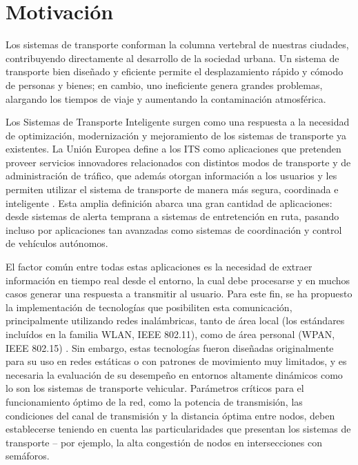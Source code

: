 \section{Motivación}

Los sistemas de transporte conforman la columna vertebral de nuestras ciudades, contribuyendo directamente al desarrollo de la sociedad urbana. Un sistema de transporte bien diseñado y eficiente permite el desplazamiento rápido y cómodo de personas y bienes; en cambio, uno ineficiente genera grandes problemas, alargando los tiempos de viaje y aumentando la contaminación atmosférica.

Los Sistemas de Transporte Inteligente surgen como una respuesta a la necesidad de optimización, modernización y mejoramiento de los sistemas de transporte ya existentes. La Unión Europea define a los ITS como aplicaciones que pretenden proveer servicios innovadores relacionados con distintos modos de transporte y de administración de tráfico, que además otorgan información a los usuarios y les permiten utilizar el sistema de transporte de manera más segura, coordinada e inteligente \cite{eudirective}. Esta amplia definición abarca una gran cantidad de aplicaciones: desde sistemas de alerta temprana a sistemas de entretención en ruta, pasando incluso por aplicaciones tan avanzadas como sistemas de coordinación y control de vehículos autónomos. 

El factor común entre todas estas aplicaciones es la necesidad de extraer información en tiempo real desde el entorno, la cual debe procesarse y en muchos casos generar una respuesta a transmitir al usuario. Para este fin, se ha propuesto la implementación de tecnologías que posibiliten esta comunicación, principalmente utilizando redes inalámbricas, tanto de área local (los estándares incluídos en la familia WLAN, IEEE 802.11), como de área personal (WPAN, IEEE 802.15) \cite{80211dailey,80215vanet,80211wave}. Sin embargo, estas tecnologías fueron diseñadas originalmente para su uso en redes estáticas o con patrones de movimiento muy limitados, y es necesaria la evaluación de su desempeño en entornos altamente dinámicos como lo son los sistemas de transporte vehicular. Parámetros críticos para el funcionamiento óptimo de la red, como la potencia de transmisión, las condiciones del canal de transmisión y la distancia óptima entre nodos, deben establecerse teniendo en cuenta las particularidades que presentan los sistemas de transporte -- por ejemplo, la alta congestión de nodos en intersecciones con semáforos.

